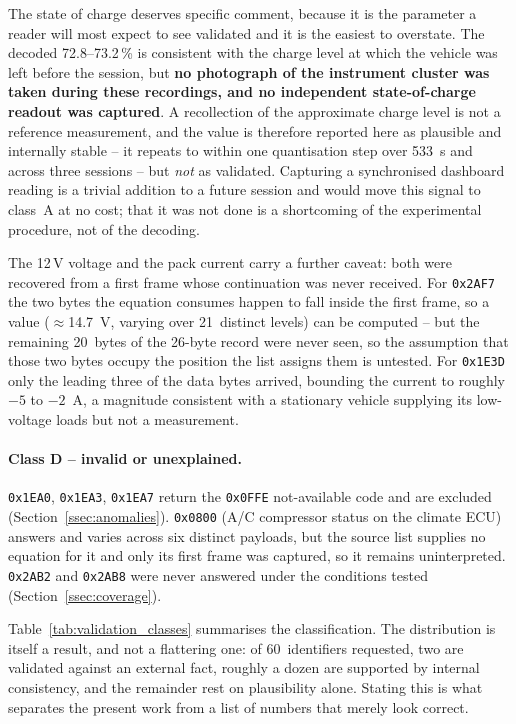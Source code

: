 \documentclass[11pt,a4paper,oneside,parskip=half]{scrreprt}
\providecommand{\hex}{}\renewcommand{\hex}[1]{\texttt{0x#1}}
\begin{document}
The state of charge deserves specific comment, because it is the parameter a reader will most expect to see validated and it is the easiest to overstate. The decoded 72.8--73.2\,\% is consistent with the charge level at which the vehicle was left before the session, but \textbf{no photograph of the instrument cluster was taken during these recordings, and no independent state-of-charge readout was captured}. A recollection of the approximate charge level is not a reference measurement, and the value is therefore reported here as plausible and internally stable -- it repeats to within one quantisation step over 533~s and across three sessions -- but \emph{not} as validated. Capturing a synchronised dashboard reading is a trivial addition to a future session and would move this signal to class~A at no cost; that it was not done is a shortcoming of the experimental procedure, not of the decoding.

The 12\,V voltage and the pack current carry a further caveat: both were recovered from a first frame whose continuation was never received. For \hex{2AF7} the two bytes the equation consumes happen to fall inside the first frame, so a value ($\approx$14.7~V, varying over 21~distinct levels) can be computed -- but the remaining 20~bytes of the 26-byte record were never seen, so the assumption that those two bytes occupy the position the list assigns them is untested. For \hex{1E3D} only the leading three of the data bytes arrived, bounding the current to roughly $-5$ to $-2$~A, a magnitude consistent with a stationary vehicle supplying its low-voltage loads but not a measurement.

\paragraph{Class D -- invalid or unexplained.} \hex{1EA0}, \hex{1EA3}, \hex{1EA7} return the \hex{0FFE} not-available code and are excluded (Section~\ref{ssec:anomalies}). \hex{0800} (A/C compressor status on the climate ECU) answers and varies across six distinct payloads, but the source list supplies no equation for it and only its first frame was captured, so it remains uninterpreted. \hex{2AB2} and \hex{2AB8} were never answered under the conditions tested (Section~\ref{ssec:coverage}).

\medskip\noindent
Table~\ref{tab:validation_classes} summarises the classification. The distribution is itself a result, and not a flattering one: of 60~identifiers requested, two are validated against an external fact, roughly a dozen are supported by internal consistency, and the remainder rest on plausibility alone. Stating this is what separates the present work from a list of numbers that merely look correct.
\end{document}

